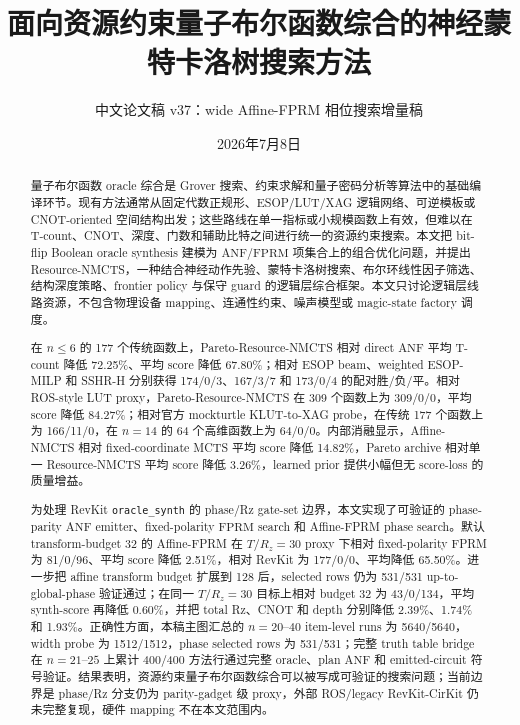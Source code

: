 \documentclass[UTF8,fontset=macnew,11pt]{ctexart}
\title{面向资源约束量子布尔函数综合的神经蒙特卡洛树搜索方法}
\author{中文论文稿 v37：wide Affine-FPRM 相位搜索增量稿}
\date{2026年7月8日}
\newcommand{\method}{Resource-NMCTS}
\newcommand{\anf}{\ensuremath{\mathrm{ANF}}}
\newcommand{\fprm}{\ensuremath{\mathrm{FPRM}}}
\newcommand{\ttable}{truth table}
\begin{document}
\pagestyle{plain}
\maketitle

\begin{abstract}
量子布尔函数 oracle 综合是 Grover 搜索、约束求解和量子密码分析等算法中的基础编译环节。现有方法通常从固定代数正规形、ESOP/LUT/XAG 逻辑网络、可逆模板或 CNOT-oriented 空间结构出发；这些路线在单一指标或小规模函数上有效，但难以在 T-count、CNOT、深度、门数和辅助比特之间进行统一的资源约束搜索。本文把 bit-flip Boolean oracle synthesis 建模为 \anf{}/\fprm{} 项集合上的组合优化问题，并提出 \method{}，一种结合神经动作先验、蒙特卡洛树搜索、布尔环线性因子筛选、结构深度策略、frontier policy 与保守 guard 的逻辑层综合框架。本文只讨论逻辑层线路资源，不包含物理设备 mapping、连通性约束、噪声模型或 magic-state factory 调度。

在 $n\leq6$ 的 177 个传统函数上，Pareto-\method{} 相对 direct \anf{} 平均 T-count 降低 72.25\%、平均 score 降低 67.80\%；相对 ESOP beam、weighted ESOP-MILP 和 SSHR-H 分别获得 174/0/3、167/3/7 和 173/0/4 的配对胜/负/平。相对 ROS-style LUT proxy，Pareto-\method{} 在 309 个函数上为 309/0/0，平均 score 降低 84.27\%；相对官方 mockturtle KLUT-to-XAG probe，在传统 177 个函数上为 166/11/0，在 $n=14$ 的 64 个高维函数上为 64/0/0。内部消融显示，Affine-NMCTS 相对 fixed-coordinate MCTS 平均 score 降低 14.82\%，Pareto archive 相对单一 \method{} 平均 score 降低 3.26\%，learned prior 提供小幅但无 score-loss 的质量增益。

为处理 RevKit \texttt{oracle\_synth} 的 phase/Rz gate-set 边界，本文实现了可验证的 phase-parity \anf{} emitter、fixed-polarity \fprm{} search 和 Affine-FPRM phase search。默认 transform-budget 32 的 Affine-FPRM 在 $T/R_z=30$ proxy 下相对 fixed-polarity FPRM 为 81/0/96、平均 score 降低 2.51\%，相对 RevKit 为 177/0/0、平均降低 65.50\%。进一步把 affine transform budget 扩展到 128 后，selected rows 仍为 531/531 up-to-global-phase 验证通过；在同一 $T/R_z=30$ 目标上相对 budget 32 为 43/0/134，平均 synth-score 再降低 0.60\%，并把 total Rz、CNOT 和 depth 分别降低 2.39\%、1.74\% 和 1.93\%。正确性方面，本稿主图汇总的 $n=20$--$40$ item-level runs 为 5640/5640，width probe 为 1512/1512，phase selected rows 为 531/531；完整 \ttable{} bridge 在 $n=21$--$25$ 上累计 400/400 方法行通过完整 oracle、plan \anf{} 和 emitted-circuit 符号验证。结果表明，资源约束量子布尔函数综合可以被写成可验证的搜索问题；当前边界是 phase/Rz 分支仍为 parity-gadget 级 proxy，外部 ROS/legacy RevKit-CirKit 仍未完整复现，硬件 mapping 不在本文范围内。
\end{abstract}
\end{document}
